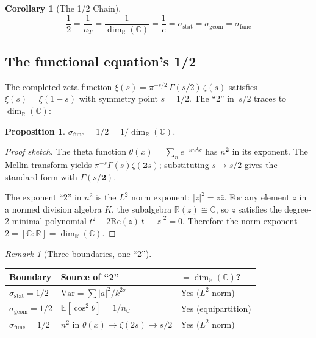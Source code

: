 \documentclass[12pt]{article}
\newtheorem{corollary}[theorem]{Corollary}
\newtheorem{proposition}[theorem]{Proposition}
\theoremstyle{definition}
\theoremstyle{remark}
\newtheorem{remark}[theorem]{Remark}
\newcommand{\CC}{\mathbb{C}}
\newcommand{\RR}{\mathbb{R}}
\begin{document}
\begin{corollary}[The 1/2 Chain]\label{cor:chain}
$$\frac{1}{2} = \frac{1}{n_T} = \frac{1}{\dim_\RR(\CC)}
  = \frac{1}{c} = \sigma_{\mathrm{stat}} = \sigma_{\mathrm{geom}}
  = \sigma_{\mathrm{func}}$$
\end{corollary}

\subsection{The functional equation's 1/2}

The completed zeta function
$\xi(s) = \pi^{-s/2}\,\Gamma(s/2)\,\zeta(s)$
satisfies $\xi(s) = \xi(1-s)$ with symmetry point $s = 1/2$.
The ``2'' in~$s/2$ traces to $\dim_\RR(\CC)$:

\begin{proposition}\label{prop:func}
$\sigma_{\mathrm{func}} = 1/2 = 1/\dim_\RR(\CC)$.
\end{proposition}
\begin{proof}[Proof sketch]
The theta function
$\theta(x) = \sum_{n} e^{-\pi n^2 x}$
has $n^{\mathbf{2}}$ in its exponent.
The Mellin transform yields $\pi^{-s}\Gamma(s)\zeta(\mathbf{2}s)$;
substituting $s \to s/2$ gives the standard form with
$\Gamma(s/\mathbf{2})$.

The exponent ``$2$'' in $n^2$ is the $L^2$ norm exponent:
$|z|^2 = z\bar{z}$.
For any element $z$ in a normed division algebra $K$,
the subalgebra $\RR(z) \cong \CC$, so $z$ satisfies
the degree-2 minimal polynomial
$t^2 - 2\mathrm{Re}(z)\,t + |z|^2 = 0$.
Therefore the norm exponent $2 = [\CC:\RR] = \dim_\RR(\CC)$.
\end{proof}

\begin{remark}[Three boundaries, one ``2'']
\leavevmode
\begin{center}
\begin{tabular}{lll}
\toprule
Boundary & Source of ``2'' & $= \dim_\RR(\CC)$? \\
\midrule
$\sigma_{\mathrm{stat}} = 1/2$ &
  $\mathrm{Var} = \sum |a|^2 / k^{2\sigma}$ & Yes ($L^2$ norm) \\
$\sigma_{\mathrm{geom}} = 1/2$ &
  $\mathbb{E}[\cos^2\theta] = 1/n_\CC$ & Yes (equipartition) \\
$\sigma_{\mathrm{func}} = 1/2$ &
  $n^2$ in $\theta(x) \to \zeta(2s) \to s/2$ & Yes ($L^2$ norm) \\
\bottomrule
\end{tabular}
\end{center}
\end{remark}
\end{document}
